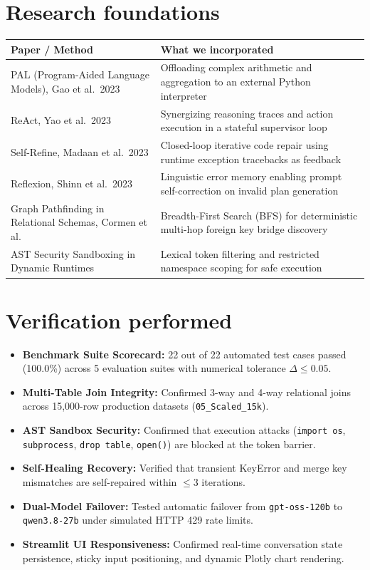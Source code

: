 \documentclass[11pt,a4paper]{article}
\begin{document}
\newpage
\section{Research foundations}
{\footnotesize
\begin{center}
\begin{tabular}{@{}lp{7.8cm}@{}}
\toprule
Paper / Method & What we incorporated \\
\midrule
PAL (Program-Aided Language Models), Gao et al.\ 2023 & Offloading complex arithmetic and aggregation to an external Python interpreter \\
ReAct, Yao et al.\ 2023 & Synergizing reasoning traces and action execution in a stateful supervisor loop \\
Self-Refine, Madaan et al.\ 2023 & Closed-loop iterative code repair using runtime exception tracebacks as feedback \\
Reflexion, Shinn et al.\ 2023 & Linguistic error memory enabling prompt self-correction on invalid plan generation \\
Graph Pathfinding in Relational Schemas, Cormen et al. & Breadth-First Search (BFS) for deterministic multi-hop foreign key bridge discovery \\
AST Security Sandboxing in Dynamic Runtimes & Lexical token filtering and restricted namespace scoping for safe execution \\
\bottomrule
\end{tabular}
\end{center}
}

\section{Verification performed}
\begin{itemize}[leftmargin=1.0cm]
\item \textbf{Benchmark Suite Scorecard:} 22 out of 22 automated test cases passed (100.0\%) across 5 evaluation suites with numerical tolerance $\Delta \le 0.05$.
\item \textbf{Multi-Table Join Integrity:} Confirmed 3-way and 4-way relational joins across 15,000-row production datasets (\texttt{05\_Scaled\_15k}).
\item \textbf{AST Sandbox Security:} Confirmed that execution attacks (\texttt{import os}, \texttt{subprocess}, \texttt{drop table}, \texttt{open()}) are blocked at the token barrier.
\item \textbf{Self-Healing Recovery:} Verified that transient KeyError and merge key mismatches are self-repaired within $\le 3$ iterations.
\item \textbf{Dual-Model Failover:} Tested automatic failover from \texttt{gpt-oss-120b} to \texttt{qwen3.8-27b} under simulated HTTP 429 rate limits.
\item \textbf{Streamlit UI Responsiveness:} Confirmed real-time conversation state persistence, sticky input positioning, and dynamic Plotly chart rendering.
\end{itemize}
\end{document}
